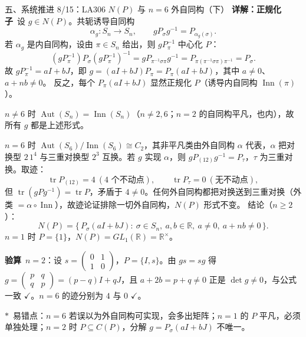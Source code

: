 \documentclass[aspectratio=169,10pt,fontset=none]{ctexbeamer}
\newcommand{\key}[1]{\textcolor{ink}{\bfseries #1}}
\newcommand{\starpt}{\textcolor{accent}{\bfseries$\ast$}}
\begin{document}
\begin{frame}[t]{五、系统推进 8/15：LA306 $N(P)$ 与 $n=6$ 外自同构（下）}
\scriptsize
\key{详解：正规化子}\ 设 $g\in N(P)$。共轭诱导自同构
\[
\alpha_g:S_n\to S_n,\qquad gP_\sigma g^{-1}=P_{\alpha_g(\sigma)}.
\]
若 $\alpha_g$ 是内自同构，设由 $\pi\in S_n$ 给出，则 $gP_\pi^{-1}$ 中心化 $P$：
\[
(gP_\pi^{-1})P_\sigma(gP_\pi^{-1})^{-1}=gP_{\pi^{-1}\sigma\pi}g^{-1}=P_{\pi(\pi^{-1}\sigma\pi)\pi^{-1}}=P_\sigma.
\]
故 $gP_\pi^{-1}=aI+bJ$，即 $g=(aI+bJ)P_\pi=P_\pi(aI+bJ)$，其中 $a\ne0$、$a+nb\ne0$。
反之，每个 $P_\pi(aI+bJ)$ 显然正规化 $P$（诱导内自同构 $\operatorname{Inn}(\pi)$）。

$n\ne6$ 时 $\operatorname{Aut}(S_n)=\operatorname{Inn}(S_n)$（$n\ne2,6$；$n=2$ 的自同构平凡，也内），故所有 $g$ 都是上述形式。

$n=6$ 时 $\operatorname{Aut}(S_6)/\operatorname{Inn}(S_6)\cong C_2$，其非平凡类由外自同构 $\alpha$ 代表，$\alpha$ 把对换型 $2\,1^4$ 与三重对换型 $2^3$ 互换。若 $g$ 实现 $\alpha$，则 $gP_{(12)}g^{-1}=P_\tau$，$\tau$ 为三重对换。取迹：
\[
\operatorname{tr}P_{(12)}=4\ (\text{4 个不动点}),\qquad \operatorname{tr}P_\tau=0\ (\text{无不动点}),
\]
但 $\operatorname{tr}(gPg^{-1})=\operatorname{tr}P$，矛盾于 $4\ne0$。任何外自同构都把对换送到三重对换（外类 $=\alpha\circ\operatorname{Inn}$），故迹论证排除一切外自同构，$N(P)$ 形式不变。
结论（$n\ge2$）：
\[
N(P)=\{\,P_\sigma(aI+bJ):\ \sigma\in S_n,\ a,b\in\mathbb R,\ a\ne0,\ a+nb\ne0\,\}.
\]
$n=1$ 时 $P=\{1\}$，$N(P)=GL_1(\mathbb R)=\mathbb R^\times$。

\key{验算}\ $n=2$：设 $s=\begin{pmatrix}0&1\\1&0\end{pmatrix}$，$P=\{I,s\}$。由 $gs=sg$ 得 $g=\begin{pmatrix}p&q\\q&p\end{pmatrix}=(p-q)I+qJ$，且 $a+2b=p+q\ne0$ 正是 $\det g\ne0$，与公式一致 $\checkmark$。$n=6$ 的迹分别为 $4$ 与 $0$ $\checkmark$。

\starpt\ 易错点：$n=6$ 若误以为外自同构可实现，会多出矩阵；$n=1$ 的 $P$ 平凡，必须单独处理；$n=2$ 时 $P\subseteq C(P)$，分解 $g=P_\sigma(aI+bJ)$ 不唯一。
\end{frame}
\end{document}
